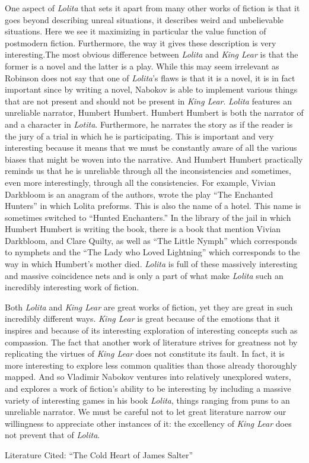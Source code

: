 \documentclass[12pt]{article}
\begin{document}
One aspect of \textit{Lolita} that sets it apart from many other works of fiction is that it goes beyond describing unreal situations, it describes weird and unbelievable situations. Here we see it maximizing in particular the value function of postmodern fiction. Furthermore, the way it gives these description is very interesting.The most obvious difference between \textit{Lolita} and \textit{King Lear} is that the former is a novel and the latter is a play. While this may seem irrelevant as Robinson does not say that one of \textit{Lolita}'s flaws is that it is a novel, it is in fact important since by writing a novel, Nabokov is able to implement various things that are not present and should not be present in \textit{King Lear}. \textit{Lolita} features an unreliable narrator, Humbert Humbert. Humbert Humbert is both the narrator of and a character in \textit{Lotita}. Furthermore, he narrates the story as if the reader is the jury of a trial in which he is participating. This is important and very interesting because it means that we must be constantly aware of all the various biases that might be woven into the narrative. And Humbert Humbert practically reminds us that he is unreliable through all the inconsistencies and sometimes, even more interestingly, through all the consistencies. For example, Vivian Darkbloom is an anagram of the authors, wrote the play ``The Enchanted Hunters'' in which Lolita preforms. This is also the name of a hotel. This name is sometimes switched to ``Hunted Enchanters.'' In the library of the jail in which Humbert Humbert is writing the book, there is a book that mention Vivian Darkbloom, and Clare Quilty, as well as ``The Little Nymph'' which corresponds to nymphets and the ``The Lady who Loved Lightning'' which corresponds to the way in which Humbert's mother died. \textit{Lolita} is full of these massively interesting and massive coincidence nets and is only a part of what make \textit{Lolita} such an incredibly interesting work of fiction.

Both \textit{Lolita} and \textit{King Lear} are great works of fiction, yet they are great in such incredibly different ways. \textit{King Lear} is great because of the emotions that it inspires and because of its interesting exploration of interesting concepts such as compassion. The fact that another work of literature strives for greatness not by replicating the virtues of \textit{King Lear} does not constitute its fault. In fact, it is more interesting to explore less common qualities than those already thoroughly mapped. And so Vladimir Nabokov ventures into relatively unexplored waters, and explores a work of fiction's ability to be interesting by including a massive variety of interesting games in his book \textit{Lolita}, things ranging from puns to an unreliable narrator. We must be careful not to let great literature narrow our willingness to appreciate other instances of it: the excellency of \textit{King Lear} does not prevent that of \textit{Lolita}.

\newpage
Literature Cited: \newline
``The Cold Heart of James Salter''
\end{document}
